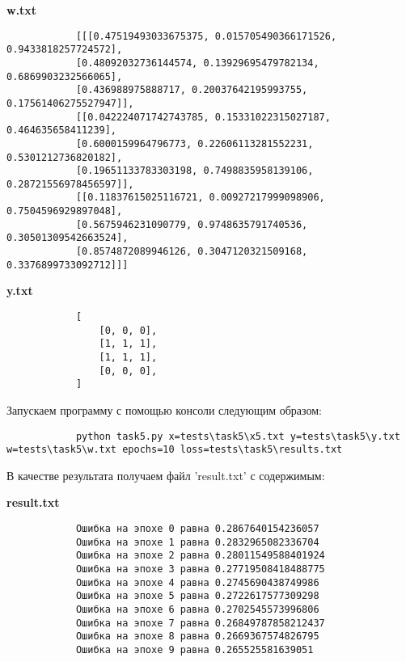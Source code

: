 \documentclass[bachelor, och, report]{../shiza}
\begin{document}
        \textbf{w.txt}
        \begin{verbatim}
            [[[0.47519493033675375, 0.015705490366171526, 0.9433818257724572],
            [0.48092032736144574, 0.13929695479782134, 0.6869903232566065],
            [0.436988975888717, 0.20037642195993755, 0.17561406275527947]],
            [[0.042224071742743785, 0.15331022315027187, 0.464635658411239],
            [0.6000159964796773, 0.22606113281552231, 0.5301212736820182],
            [0.19651133783303198, 0.7498835958139106, 0.28721556978456597]],
            [[0.11837615025116721, 0.00927217999098906, 0.7504596929897048],
            [0.5675946231090779, 0.9748635791740536, 0.30501309542663524],
            [0.8574872089946126, 0.3047120321509168, 0.3376899733092712]]]
        \end{verbatim}

        \textbf{y.txt}
        \begin{verbatim}
            [
                [0, 0, 0],
                [1, 1, 1],
                [1, 1, 1],
                [0, 0, 0],
            ]
        \end{verbatim}

        Запускаем программу с помощью консоли следующим образом:

        \begin{verbatim}
            python task5.py x=tests\task5\x5.txt y=tests\task5\y.txt w=tests\task5\w.txt epochs=10 loss=tests\task5\results.txt
        \end{verbatim}

        В качестве результата получаем файл 'result.txt' с содержимым:

        \textbf{result.txt}
        \begin{verbatim}
            Ошибка на эпохе 0 равна 0.2867640154236057
            Ошибка на эпохе 1 равна 0.2832965082336704
            Ошибка на эпохе 2 равна 0.28011549588401924
            Ошибка на эпохе 3 равна 0.27719508418488775
            Ошибка на эпохе 4 равна 0.2745690438749986
            Ошибка на эпохе 5 равна 0.2722617577309298
            Ошибка на эпохе 6 равна 0.2702545573996806
            Ошибка на эпохе 7 равна 0.26849787858212437
            Ошибка на эпохе 8 равна 0.2669367574826795
            Ошибка на эпохе 9 равна 0.265525581639051         
        \end{verbatim}

\end{document}
